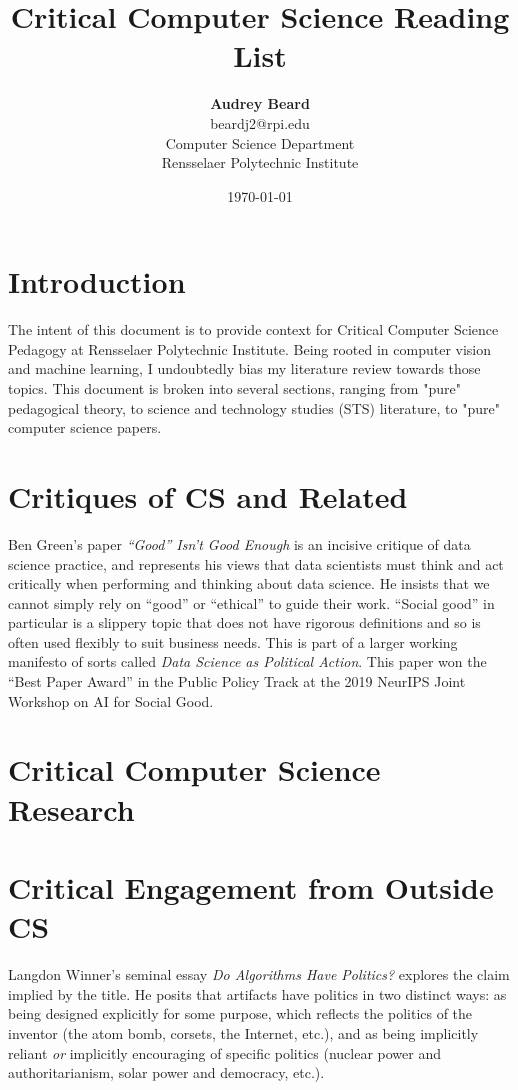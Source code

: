 \documentclass{article}
\title{Critical Computer Science Reading List}
\author{\textbf{Audrey Beard} \\
        beardj2@rpi.edu \\
        Computer Science Department \\
        Rensselaer Polytechnic Institute}
\date{\today}
\begin{document}
\maketitle

\section{Introduction}
    The intent of this document is to provide context for Critical Computer Science Pedagogy at Rensselaer Polytechnic Institute.
    Being rooted in computer vision and machine learning, I undoubtedly bias my literature review towards those topics.
    This document is broken into several sections, ranging from "pure" pedagogical theory, to science and technology studies (STS) literature, to "pure" computer science papers.
    
\section{Critiques of CS and Related}
    Ben Green's paper \textit{``Good'' Isn't Good Enough}\cite{greenGoodIsnGood2019} is an incisive critique of data science practice, and represents his views that data scientists must think and act critically when performing and thinking about data science.
    He insists that we cannot simply rely on ``good'' or ``ethical'' to guide their work. ``Social good'' in particular is a slippery topic that does not have rigorous definitions and so is often used flexibly to suit business needs.
    This is part of a larger working manifesto of sorts called \textit{Data Science as Political Action}\cite{greenDataSciencePolitical2019}.
    This paper won the ``Best Paper Award'' in the Public Policy Track at the 2019 NeurIPS Joint Workshop on AI for Social Good.

\section{Critical Computer Science Research}
    \subsection{}

\section{Critical Engagement from Outside CS}
Langdon Winner's seminal essay \textit{Do Algorithms Have Politics?}\cite{winnerArtifactsHavePolitics1980} explores the claim implied by the title. He posits that artifacts have politics in two distinct ways: as being designed explicitly for some purpose, which reflects the politics of the inventor (the atom bomb, corsets, the Internet, etc.), and as being implicitly reliant \textit{or} implicitly encouraging of specific politics (nuclear power and authoritarianism, solar power and democracy, etc.).
\end{document}
